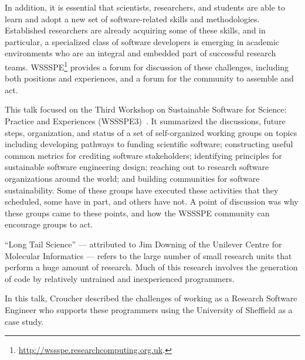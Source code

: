 \documentclass[a4paper,UKenglish]{dagrep}
\begin{document}
In addition, it is essential that scientists, researchers, and students are able to learn and adopt a new set of software-related skills and methodologies. Established researchers are already acquiring some of these skills, and in particular, a specialized class of software developers is emerging in academic environments who are an integral and embedded part of successful research teams. WSSSPE\footnote{\url{http://wssspe.researchcomputing.org.uk}.} provides a forum for discussion of these challenges, including both positions and experiences, and a forum for the community to assemble and act.

This talk focused on the Third Workshop on Sustainable Software for Science: Practice and Experiences (WSSSPE3)~\cite{wssspe3}. It summarized the discussions, future steps, organization, and status of a set of self-organized working groups on topics including developing pathways to funding scientific software; constructing useful common metrics for crediting software stakeholders; identifying principles for sustainable software engineering design; reaching out to research software organizations around the world; and building communities for software sustainability. Some of these groups have executed these activities that they scheduled, some have in part, and others have not.  A point of discussion was why these groups came to these points, and how the WSSSPE community can encourage groups to act.


``Long Tail Science'' --- attributed to Jim Downing of the Unilever Centre for Molecular Informatics --- refers to the large number of small research units that perform a huge amount of research. Much of this research involves the generation of code by relatively untrained and inexperienced programmers.

In this talk, Croucher described the challenges of working as a Research Software Engineer who supports these programmers using the University of Sheffield as a case study.

\end{document}
